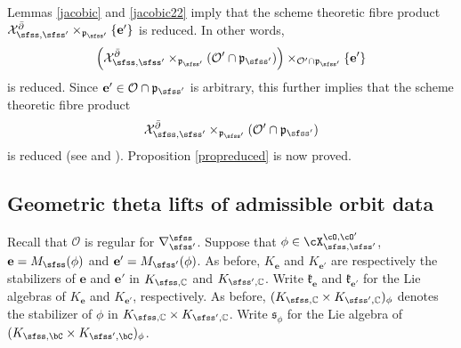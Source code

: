 \documentclass[11pt,a4paper]{amsart}
\newcommand{\CO}{{\mathcal {O}}}
\newcommand{\CX}{{\mathcal {X}}}
\newcommand{\p}{\mathfrak p}
\numberwithin{equation}{section}
\theoremstyle{remark}
\def\AOD{\mathrm{AOD}}
\begin{document}
Lemmas \ref{jacobic} and \ref{jacobic22} imply that the scheme theoretic fibre product $\CX_{\sfss, \sfss'}^{\bar \partial}\times_{\p_{\sfss'}} \{\mathbf e'\}$ is reduced.
In other words,
\[
\left(\CX_{\sfss, \sfss'}^{\bar \partial}\times_{\p_{\sfss'}} ({\CO'}\cap \p_{\sfss'})\right)\times_{\CO'\cap \p_{\sfss'}}\{\mathbf e'\}
\]
is reduced.
Since $\mathbf e'\in \CO\cap \p_{\sfss'}$ is arbitrary, this further implies that  the scheme theoretic  fibre product
\[
\CX_{\sfss, \sfss'}^{\bar \partial}\times_{\p_{\sfss'}} ({\CO'}\cap \p_{\sfss'})
\]
is reduced (see \cite[Proposition~11.3.13]{EGAIV3} and \cite[Th\'eor\`eme~6.9.1]{EGAIV2}). Proposition  \ref{propreduced} is now proved.


\subsection{Geometric theta lifts of admissible orbit data}

\def\wedgetop{{\bigwedge}^{\mathrm{top}}}

\medskip

\def\dlift{{\check\vartheta}}
\def\AOD{\mathrm{AOD}}

Recall that  $\CO$ is regular for $\DDss$. Suppose that $\phi\in \CXOO$, $\mathbf e=M_\sfss(\phi)$ and $\mathbf e'=M_{\sfss'}(\phi)$. As before, $K_\mathbf e$ and $K_{\mathbf e'}$ are respectively the  stabilizers of $\mathbf e$ and $\mathbf e'$ in $K_{\sfss, \C}$ and $K_{\sfss', \C}$.  Write $\mathfrak k_{\mathbf e}$ and $\mathfrak k_{\mathbf e'}$ for the Lie algebras of $K_{\mathbf e}$ and $K_{\mathbf e'}$, respectively. As before, $(K_{\sfss, \C}\times K_{\sfss', \C})_{\ww}$ denotes the stabilizer of $\phi$ in $K_{\sfss, \C}\times K_{\sfss', \C}$.
   Write $\mathfrak s_\phi$ for the Lie algebra of  $(\Ks\times \Ksp)_{\ww}$.
\end{document}
